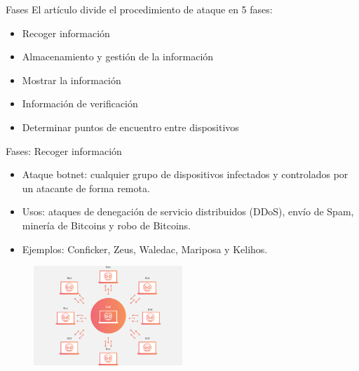 \documentclass[aspectratio=43]{beamer}
\begin{document}
\begin{frame}{Fases}
  El artículo divide el procedimiento de ataque en 5 fases:   
  \begin{itemize}
  \item Recoger información
  \item Almacenamiento y gestión de la información
  \item Mostrar la información
  \item Información de verificación
  \item Determinar puntos de encuentro entre dispositivos
  \end{itemize}  
\end{frame}

\begin{frame}{Fases: Recoger información}
  
  \begin{itemize}
  \item Ataque botnet: cualquier grupo de dispositivos infectados y controlados por un atacante de forma remota.  
  
  \item Usos: ataques de denegación de servicio distribuidos (DDoS), envío de Spam, minería de Bitcoins y robo de Bitcoins.  


 \item Ejemplos: Conficker, Zeus, Waledac, Mariposa y Kelihos. 
 
  \end{itemize}
  
  
\begin{figure}[htbp] 	
   \includegraphics[width=0.50\textwidth]{figuras/botnet}  
  \label{botnet}

\end{figure}

\end{frame}
\end{document}
